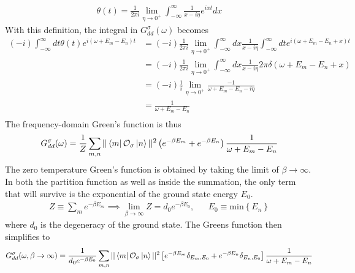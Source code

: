 \documentclass{report}
\numberwithin{equation}{section}
\begin{document}
\begin{appendices}
\begin{equation}
\begin{aligned}
	\theta(t) = \frac{1}{2\pi i}\lim_{\eta \to 0^+} \int_{-\infty}^\infty \frac{1}{x- i\eta}e^{ixt}dx
\end{aligned}\end{equation}
With this definition, the integral in \(G_{dd}^\sigma(\omega)\) becomes
\begin{equation}\begin{aligned}
	\left(-i\right)\int_{-\infty}^\infty dt \theta(t)e^{i\left( \omega + E_m - E_n \right)t} &= \left(-i\right)\frac{1}{2\pi i}\lim_{\eta \to 0^+} \int_{-\infty}^\infty dx\frac{1}{x- i\eta}\int_{-\infty}^\infty dt e^{i\left( \omega + E_m - E_n + x\right)t} \\
									     &=\left(-i\right)\frac{1}{2\pi i}\lim_{\eta \to 0^+} \int_{-\infty}^\infty dx\frac{1}{x- i\eta} 2\pi \delta\left( \omega + E_m - E_n + x\right) \\
									     &=\left(-i\right)\frac{1}{i}\lim_{\eta \to 0^+} \frac{-1}{\omega + E_m - E_n- i\eta} \\
									     &=\frac{1}{\omega + E_m - E_n} \\
\end{aligned}\end{equation}
The frequency-domain Green's function is thus
\begin{equation}\begin{aligned}
	G_{d d}^\sigma(\omega) = \frac{1}{Z}\sum_{m,n}||\bra{m}\mathcal{O}_{\sigma}\ket{n}||^2\left( e^{-\beta E_m} + e^{-\beta E_n}\right)\frac{1}{\omega + E_m - E_n}
\end{aligned}\end{equation}
The zero temperature Green's function is obtained by taking the limit of \(\beta \to \infty\). In both the partition function as well as inside the summation, the only term that will survive is the exponential of the ground state energy \(E_0\).
\begin{equation*}\begin{aligned}
	Z \equiv \sum_m e^{-\beta E_m} \implies \lim_{\beta \to \infty}Z = d_0 e^{-\beta E_0}, && E_0 \equiv \text{min}\left\{ E_n \right\} 
\end{aligned}\end{equation*}
where \(d_0\) is the degeneracy of the ground state. The Greens function then simplifies to
\begin{equation}\begin{aligned}
	\label{Gf_lk}
	G_{d d}^\sigma(\omega, \beta \to \infty) &= \frac{1}{d_0e^{-\beta E_0}}\sum_{m,n}||\bra{m}\mathcal{O}_{\sigma}\ket{n}||^2\left[e^{-\beta E_m}\delta_{E_m, E_0} + e^{-\beta E_n}\delta_{E_n, E_0}\right]\frac{1}{\omega + E_m - E_n}\\

\end{aligned}
\end{equation}
\end{appendices}
\end{document}
